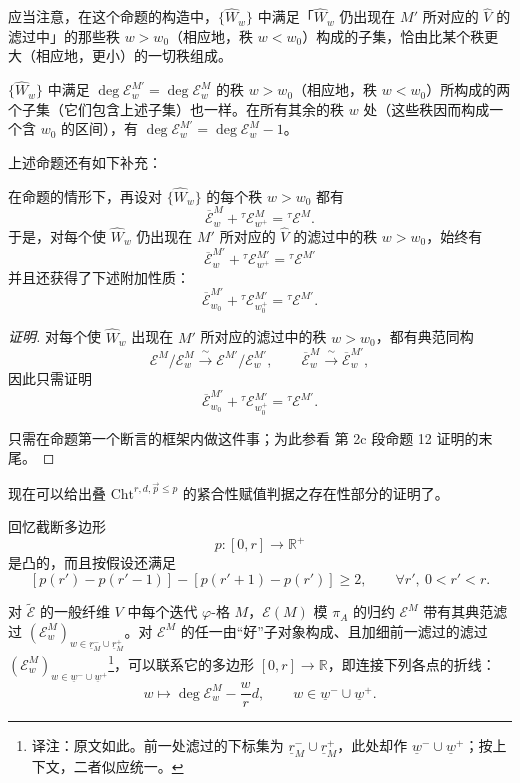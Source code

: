 应当注意，在这个命题的构造中，$\{\widehat{W}_w\}$ 中满足「$\widehat{W}_w$ 仍出现在 $M'$ 所对应的 $\widehat{V}$ 的滤过中」的那些秩 $w > w_0$（相应地，秩 $w < w_0$）构成的子集，恰由比某个秩更大（相应地，更小）的一切秩组成。

$\{\widehat{W}_w\}$ 中满足 $\deg \mathcal{E}^{M'}_w = \deg \mathcal{E}^M_w$ 的秩 $w > w_0$（相应地，秩 $w < w_0$）所构成的两个子集（它们包含上述子集）也一样。在所有其余的秩 $w$ 处（这些秩因而构成一个含 $w_0$ 的区间），有 $\deg \mathcal{E}^{M'}_w = \deg \mathcal{E}^M_w - 1$。

上述命题还有如下补充：

\begin{corollary*}
在命题的情形下，再设对 $\{\widehat{W}_w\}$ 的每个秩 $w > w_0$ 都有
\[
\overline{\mathcal{E}}^M_w + {}^\tau\mathcal{E}^M_{w^+} = {}^\tau\mathcal{E}^M.
\]
于是，对每个使 $\widehat{W}_w$ 仍出现在 $M'$ 所对应的 $\widehat{V}$ 的滤过中的秩 $w > w_0$，始终有
\[
\overline{\mathcal{E}}^{M'}_w + {}^\tau\mathcal{E}^{M'}_{w^+} = {}^\tau\mathcal{E}^{M'}
\]
并且还获得了下述附加性质：
\[
\overline{\mathcal{E}}^{M'}_{w_0} + {}^\tau\mathcal{E}^{M'}_{w_0^+} = {}^\tau\mathcal{E}^{M'}.
\]
\end{corollary*}

\begin{proof}[证明]
对每个使 $\widehat{W}_w$ 出现在 $M'$ 所对应的滤过中的秩 $w > w_0$，都有典范同构
\[
\mathcal{E}^M/\mathcal{E}^M_w \xrightarrow{\ \sim\ } \mathcal{E}^{M'}/\mathcal{E}^{M'}_w, \qquad
\overline{\mathcal{E}}^M_w \xrightarrow{\ \sim\ } \overline{\mathcal{E}}^{M'}_w,
\]
因此只需证明
\[
\overline{\mathcal{E}}^{M'}_{w_0} + {}^\tau\mathcal{E}^{M'}_{w_0^+} = {}^\tau\mathcal{E}^{M'}.
\]

只需在命题第一个断言的框架内做这件事；为此参看 \cite{lafforgue98} 第 2c 段命题 12 证明的末尾。
\end{proof}

现在可以给出叠 $\mathrm{Cht}^{r,d,\vec{p}\le p}$ 的紧合性赋值判据之存在性部分的证明了。

回忆截断多边形
\[
p : [0, r] \to \mathbb{R}^+
\]
是凸的，而且按假设还满足
\[
[p(r') - p(r'-1)] - [p(r'+1) - p(r')] \geq 2, \qquad \forall r', \ 0 < r' < r.
\]

对 $\tilde{\mathcal{E}}$ 的一般纤维 $V$ 中每个迭代 $\varphi$-格 $M$，$\mathcal{E}(M)$ 模 $\pi_A$ 的归约 $\mathcal{E}^M$ 带有其典范滤过 $(\mathcal{E}^M_w)_{w \in \underline{r}^-_M \cup \underline{r}^+_M}$。对 $\mathcal{E}^M$ 的任一由“好”子对象构成、且加细前一滤过的滤过 $(\mathcal{E}^M_w)_{w \in \underline{w}^- \cup \underline{w}^+}$\footnote{译注：原文如此。前一处滤过的下标集为 $\underline{r}^-_M \cup \underline{r}^+_M$，此处却作 $\underline{w}^- \cup \underline{w}^+$；按上下文，二者似应统一。}，可以联系它的多边形 $[0, r] \to \mathbb{R}$，即连接下列各点的折线：
\[
w \mapsto \deg \mathcal{E}^M_w - \frac{w}{r}d, \qquad w \in \underline{w}^- \cup \underline{w}^+.
\]

